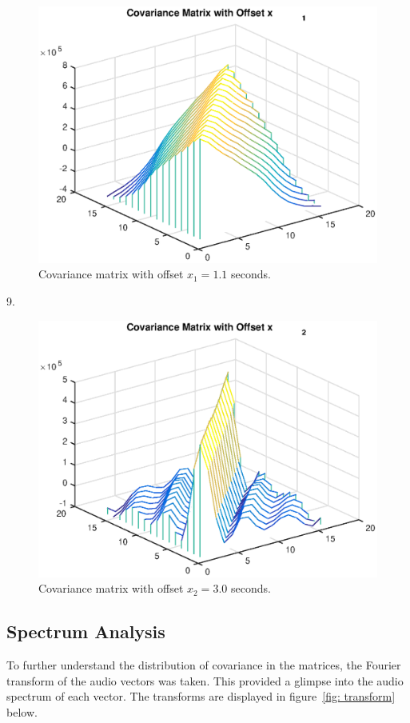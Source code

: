 \begin{figure}[H] 
	\centering 
	\includegraphics[width=\linewidth]{plot_3.eps}
	\caption{Covariance matrix with offset $x_1 = 1.1$ seconds.}
	\label{fig: c2} 
\end{figure}
9.
\begin{figure}[H] 
	\centering 
	\includegraphics[width=\linewidth]{plot_4.eps}
	\caption{Covariance matrix with offset $x_2 = 3.0$ seconds.}
	\label{fig: c3} 
\end{figure}

\subsection{Spectrum Analysis} 
To further understand the distribution of covariance in the matrices, the Fourier transform of the audio vectors was taken. This provided a glimpse into the audio spectrum of each vector. The transforms are displayed in figure~\ref{fig: transform} below. \\

